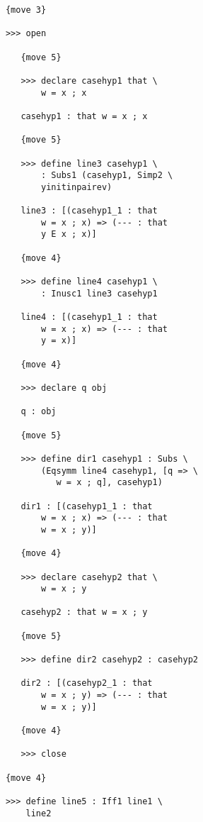 \documentclass[12pt]{article}
\begin{document}
\begin{verbatim}
            {move 3}

            >>> open

               {move 5}

               >>> declare casehyp1 that \
                   w = x ; x

               casehyp1 : that w = x ; x

               {move 5}

               >>> define line3 casehyp1 \
                   : Subs1 (casehyp1, Simp2 \
                   yinitinpairev)

               line3 : [(casehyp1_1 : that 
                   w = x ; x) => (--- : that 
                   y E x ; x)]

               {move 4}

               >>> define line4 casehyp1 \
                   : Inusc1 line3 casehyp1

               line4 : [(casehyp1_1 : that 
                   w = x ; x) => (--- : that 
                   y = x)]

               {move 4}

               >>> declare q obj

               q : obj

               {move 5}

               >>> define dir1 casehyp1 : Subs \
                   (Eqsymm line4 casehyp1, [q => \
                      w = x ; q], casehyp1)

               dir1 : [(casehyp1_1 : that 
                   w = x ; x) => (--- : that 
                   w = x ; y)]

               {move 4}

               >>> declare casehyp2 that \
                   w = x ; y

               casehyp2 : that w = x ; y

               {move 5}

               >>> define dir2 casehyp2 : casehyp2

               dir2 : [(casehyp2_1 : that 
                   w = x ; y) => (--- : that 
                   w = x ; y)]

               {move 4}

               >>> close

            {move 4}

            >>> define line5 : Iff1 line1 \
                line2


\end{verbatim}
\end{document}
